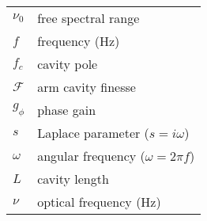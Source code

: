\begin{tabular}{|l|l|}
\hline
$\nu_0$         & free spectral range \\
$f$             & frequency (Hz) \\
$f_c$           & cavity pole \\
$\mathcal{F}$   & arm cavity finesse \\
$g_\phi$         & phase gain \\
$s$             & Laplace parameter ($s=i\omega$) \\
$\omega$        & angular frequency ($\omega=2\pi f$) \\
$L$             & cavity length \\
$\nu$           & optical frequency (Hz) \\
\hline
\end{tabular}
